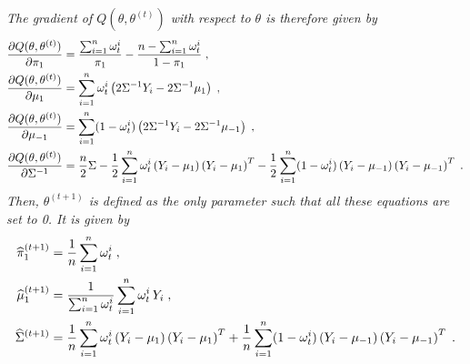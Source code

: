 \begin{enumerate}
{\em
The gradient of $Q(\theta,\theta^{(t)})$ with respect to $\theta$ is therefore given by
\begin{align*}
\frac{\partial Q(\theta,\theta^{(t)})}{\partial \pi_1} &= \frac{\sum_{i=1}^n\omega_t^i}{\pi_1} - \frac{n-\sum_{i=1}^n\omega_t^i}{1-\pi_{1}}\;,\\
\frac{\partial Q(\theta,\theta^{(t)})}{\partial \mu_1} &= \sum_{i=1}^n\omega_t^i\left(2\Sigma^{-1}Y_i - 2\Sigma^{-1}\mu_{1}\right)\;,\\
\frac{\partial Q(\theta,\theta^{(t)})}{\partial \mu_{-1}} &= \sum_{i=1}^n(1-\omega_t^i)\left(2\Sigma^{-1}Y_i - 2\Sigma^{-1}\mu_{-1}\right)\;,\\
\frac{\partial Q(\theta,\theta^{(t)})}{\partial \Sigma^{-1}} &= \frac{n}{2}\Sigma -  \frac{1}{2}\sum_{i=1}^n\omega_t^i\left(Y_i - \mu_{1}\right)\left(Y_i - \mu_{1}\right)^T -  \frac{1}{2}\sum_{i=1}^n(1-\omega_t^i)\left(Y_i - \mu_{-1}\right)\left(Y_i - \mu_{-1}\right)^T\;.
\end{align*}
Then, $\theta^{(t+1)}$ is defined as the only parameter such that all these equations are set to 0. It is given by
\begin{align*}
\widehat \pi_1^{(t+1)} &= \frac{1}{n}\sum_{i=1}^n\omega_t^i\;,\\
\widehat \mu_1^{(t+1)} &= \frac{1}{\sum_{i=1}^n\omega_t^i}\sum_{i=1}^n\omega_t^i\,Y_i\;,\\
\widehat\Sigma^{(t+1)} &= \frac{1}{n}\sum_{i=1}^n\omega_t^i\left(Y_i - \mu_{1}\right)\left(Y_i - \mu_{1}\right)^T +  \frac{1}{n}\sum_{i=1}^n(1-\omega_t^i)\left(Y_i - \mu_{-1}\right)\left(Y_i - \mu_{-1}\right)^T\;.
\end{align*}}
\end{enumerate}
%	
